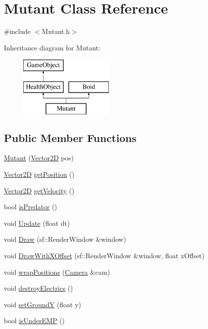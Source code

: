 \hypertarget{class_mutant}{}\section{Mutant Class Reference}
\label{class_mutant}


{\ttfamily \#include $<$Mutant.\+h$>$}

Inheritance diagram for Mutant\+:\begin{figure}[H]
\begin{center}
\leavevmode
\includegraphics[height=3.000000cm]{class_mutant}
\end{center}
\end{figure}
\subsection*{Public Member Functions}
\begin{DoxyCompactItemize}
\item 
\hyperlink{class_mutant_aa054e45e945caaef4ca7777fa32190c2}{Mutant} (\hyperlink{class_vector2_d}{Vector2D} pos)
\item 
\hyperlink{class_vector2_d}{Vector2D} \hyperlink{class_mutant_a9c3ab53037fc85159e02643ecfe46717}{get\+Position} ()
\item 
\hyperlink{class_vector2_d}{Vector2D} \hyperlink{class_mutant_af26928fa19102fe5ebea774819c4c565}{get\+Velocity} ()
\item 
bool \hyperlink{class_mutant_a3416c1b42eb1e02bdcd4066109a28812}{is\+Predator} ()
\item 
void \hyperlink{class_mutant_a69243115d28b18f3ac9803f66e8f8644}{Update} (float dt)
\item 
void \hyperlink{class_mutant_a024a5caac9b29a79a4a505d36cfd3122}{Draw} (sf\+::\+Render\+Window \&window)
\item 
void \hyperlink{class_mutant_a540fbecede166bd9c4ac68cbed72bc92}{Draw\+With\+X\+Offset} (sf\+::\+Render\+Window \&window, float x\+Offset)
\item 
void \hyperlink{class_mutant_a3bc5b923cb3605ddd10a5064ec904d29}{wrap\+Positions} (\hyperlink{class_camera}{Camera} \&cam)
\item 
void \hyperlink{class_mutant_a5bbd6188efe9a18fa208bdaaf011ccdc}{destroy\+Electrics} ()
\item 
void \hyperlink{class_mutant_ac411f16b95e51f8e3c8c694425865785}{set\+GroundY} (float y)
\item 
bool \hyperlink{class_mutant_a67fc6ef40353436d04d847f49254fa0b}{is\+Under\+E\+MP} ()
\end{DoxyCompactItemize}
